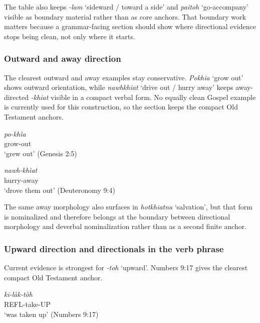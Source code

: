 \documentclass[
  11pt,
  a4paper,
]{article}
\newcommand{\tdim}[1]{\textit{#1}}
\newcommand{\tdimword}[1]{\textit{#1}}
\renewcommand{\textsc}[1]{{\footnotesize\MakeUppercase{#1}}}
\newcommand{\glossquote}[1]{`#1'}
\begin{document}
The table also keeps \tdim{-lam} \glossquote{sideward / toward a side}
and \tdim{paitoh} \glossquote{go-accompany} visible as boundary material
rather than as core anchors. That boundary work matters because a
grammar-facing section should show where directional evidence stops
being clean, not only where it starts.

\subsubsection{Outward and away
direction}\label{outward-and-away-direction}

The clearest outward and away examples stay conservative. \tdim{Pokhia}
\glossquote{grow out} shows outward orientation, while \tdim{nawhkhiat}
\glossquote{drive out / hurry away} keeps away-directed \tdim{-khiat}
visible in a compact verbal form. No equally clean Gospel example is
currently used for this construction, so the section keeps the compact
Old Testament anchors.

\begin{exe}
\ex \label{ex:dir-pokhia}
\gll \tdimword{po-khìa} \\
     grow-out \\
\glt \glossquote{grew out} (Genesis 2:5)
\end{exe}

\begin{exe}
\ex \label{ex:dir-nawhkhiat}
\gll \tdimword{nawh-khìat} \\
     hurry-away \\
\glt \glossquote{drove them out} (Deuteronomy 9:4)
\end{exe}

The same away morphology also surfaces in \tdim{hotkhiatna}
\glossquote{salvation}, but that form is nominalized and therefore
belongs at the boundary between directional morphology and deverbal
nominalization rather than as a second finite anchor.

\subsubsection{Upward direction and directionals in the verb
phrase}\label{upward-direction-and-directionals-in-the-verb-phrase}

Current evidence is strongest for \tdim{-toh} \glossquote{upward}.
Numbers 9:17 gives the clearest compact Old Testament anchor.

\begin{exe}
\ex \label{ex:dir-kilaktoh-num9}
\gll \tdimword{kī-làk-tòh} \\
     \textsc{refl}-take-\textsc{up} \\
\glt \glossquote{was taken up} (Numbers 9:17)
\end{exe}
\end{document}
